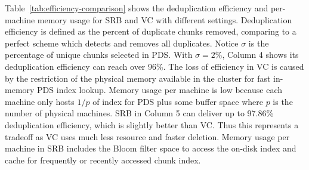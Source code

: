 Table~\ref{tab:efficiency-comparison} shows the deduplication efficiency and per-machine memory usage for SRB and VC with different 
settings.
Deduplication efficiency is defined as the percent of duplicate 
chunks removed, comparing to a perfect scheme which detects and removes  all duplicates. 
Notice $\sigma$ is the percentage of unique chunks selected in PDS.
With $\sigma =2\%$, Column 4 shows its 
deduplication efficiency can 
reach over 96\%. 
The loss of efficiency in VC is caused by the restriction of the physical memory available
in the cluster for fast in-memory PDS index lookup. 
Memory usage per machine is low because each machine only hosts $1/p$  of  index for PDS 
plus some buffer space where $p$ is the number of physical machines. 
SRB in Column 5 can deliver up to 97.86\% deduplication efficiency, which is slightly better than VC.
Thus this represents a tradeoff as VC uses much less resource  and faster deletion.
Memory usage per machine in SRB includes the Bloom filter space to access the on-disk index
and  cache for frequently or recently accessed chunk index.  

